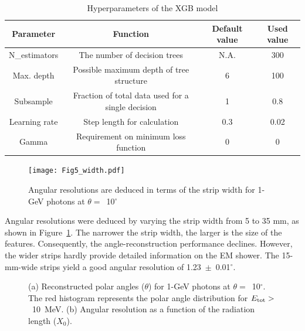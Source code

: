 \documentclass[preprint,12pt,times,a4paper]{elsarticle}
\begin{document}
\begin{table}[hbt!]{\small
\centering
\caption{Hyperparameters of the XGB model}
\begin{tabular}{cccc}
\hline 
Parameter & Function & Default value & Used value \\ \hline 
N\_estimators & The number of decision trees & N.A. & 300 \\  
Max. depth & Possible maximum depth of tree structure & 6 & 100 \\ 
Subsample & Fraction of total data used for a single decision & 1 & 0.8 \\ 
Learning rate & Step length for calculation & 0.3 & 0.02 \\ 
Gamma & Requirement on minimum loss function & 0 & 0 \\ 
\hline
\end{tabular}
\label{tab:XgbPar}
}\end{table}

\begin{figure}[!hbt]
\centering
\texttt{[image: Fig5\_width.pdf]}
\caption{ Angular resolutions are deduced in terms of the strip width for 1-GeV photons at $\theta=$~10$^{\circ}$ }
\label{fig:angle_reco_width}
\end{figure}

Angular resolutions were deduced by varying the strip width from 5 to 35 mm, as shown in Figure~\ref{fig:angle_reco_width}. The narrower the strip width, the larger is the size of the features. Consequently, the angle-reconstruction performance declines. However, the wider strips hardly provide detailed information on the EM shower. The 15-mm-wide strips yield a good angular resolution of 1.23~$\pm$~0.01$^{\circ}$.

\begin{figure}[!hbt]
\centering
{}
\caption{ (a) Reconstructed polar angles ($\theta$) for 1-GeV photons at $\theta=$~10$^{\circ}$. The red histogram represents the polar angle distribution for $E_{\rm{tot}}>$~10~MeV. (b) Angular resolution as a function of the radiation length ($X_{0}$).}
\label{fig:angle_reco_layer}
\end{figure}
\end{document}
